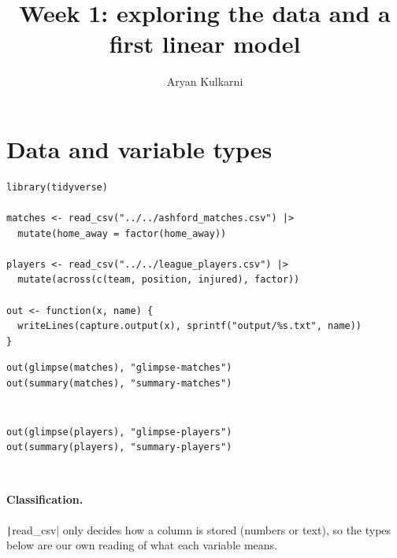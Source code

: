 \documentclass[12pt,notitlepage]{report}
\title{Week 1: exploring the data and a first linear model}
\author{Aryan Kulkarni}
\begin{document}
\maketitle


\section{Data and variable types}

\begin{verbatim}
library(tidyverse)

matches <- read_csv("../../ashford_matches.csv") |>
  mutate(home_away = factor(home_away))

players <- read_csv("../../league_players.csv") |>
  mutate(across(c(team, position, injured), factor))

out <- function(x, name) {
  writeLines(capture.output(x), sprintf("output/%s.txt", name))
}
\end{verbatim}

\begin{verbatim}
out(glimpse(matches), "glimpse-matches")
out(summary(matches), "summary-matches")
\end{verbatim}

\inputminted{text}{output/glimpse-matches.txt}
\inputminted{text}{output/summary-matches.txt}

\begin{verbatim}
out(glimpse(players), "glimpse-players")
out(summary(players), "summary-players")
\end{verbatim}

\inputminted{text}{output/glimpse-players.txt}
\inputminted{text}{output/summary-players.txt}

\paragraph{Classification.}
\texttt|read_csv| only decides how a column is stored (numbers or
text), so the types below are our own reading of what each variable means.
\end{document}
